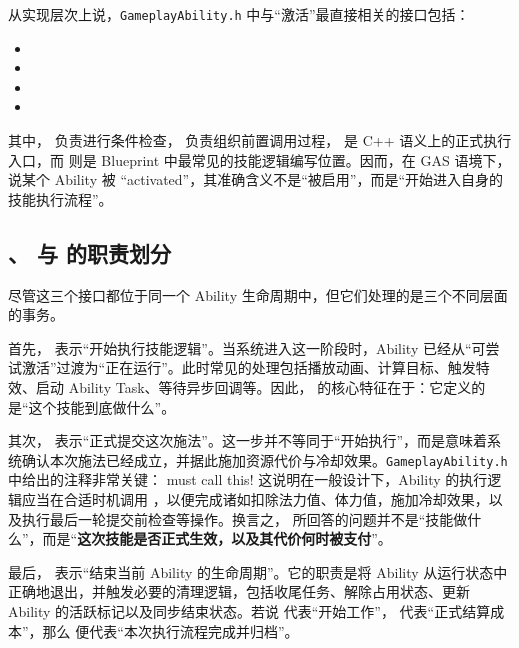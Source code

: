 从实现层次上说，\texttt{GameplayAbility.h} 中与“激活”最直接相关的接口包括：

\begin{itemize}
	\item {}
	\item {}
	\item {}
	\item {}
\end{itemize}

其中， 负责进行条件检查， 负责组织前置调用过程， 是 C++ 语义上的正式执行入口，而  则是 Blueprint 中最常见的技能逻辑编写位置。因而，在 GAS 语境下，说某个 Ability 被 “activated”，其准确含义不是“被启用”，而是“开始进入自身的技能执行流程”。

\subsection{、 与  的职责划分}

尽管这三个接口都位于同一个 Ability 生命周期中，但它们处理的是三个不同层面的事务。

首先， 表示“开始执行技能逻辑”。当系统进入这一阶段时，Ability 已经从“可尝试激活”过渡为“正在运行”。此时常见的处理包括播放动画、计算目标、触发特效、启动 Ability Task、等待异步回调等。因此， 的核心特征在于：它定义的是“这个技能到底做什么”。

其次， 表示“正式提交这次施法”。这一步并不等同于“开始执行”，而是意味着系统确认本次施法已经成立，并据此施加资源代价与冷却效果。\texttt{GameplayAbility.h} 中给出的注释非常关键： must call this! 这说明在一般设计下，Ability 的执行逻辑应当在合适时机调用 ，以便完成诸如扣除法力值、体力值，施加冷却效果，以及执行最后一轮提交前检查等操作。换言之， 所回答的问题并不是“技能做什么”，而是“\textbf{这次技能是否正式生效，以及其代价何时被支付}”。

最后， 表示“结束当前 Ability 的生命周期”。它的职责是将 Ability 从运行状态中正确地退出，并触发必要的清理逻辑，包括收尾任务、解除占用状态、更新 Ability 的活跃标记以及同步结束状态。若说  代表“开始工作”， 代表“正式结算成本”，那么  便代表“本次执行流程完成并归档”。

